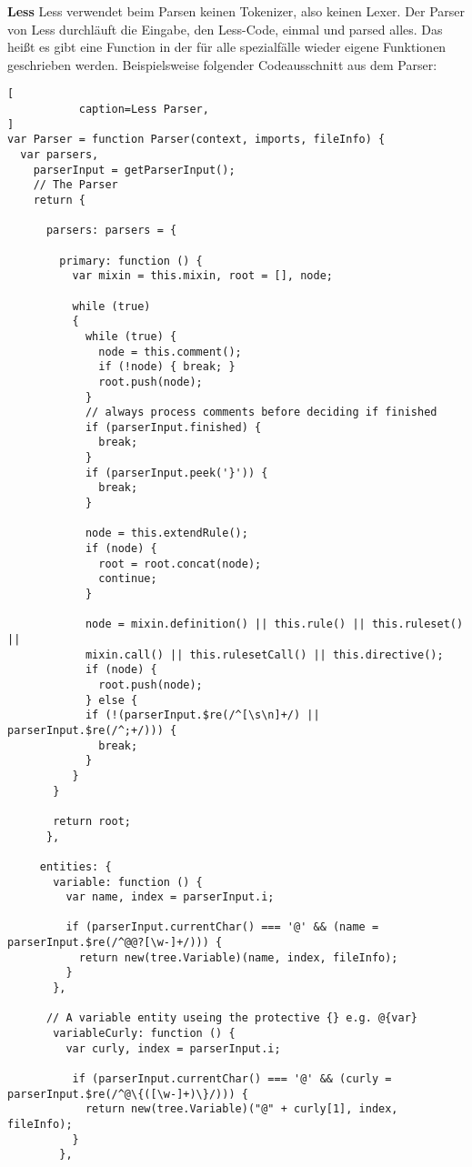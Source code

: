 \textbf{Less}\newline
Less verwendet beim Parsen keinen Tokenizer, also keinen Lexer. Der Parser von Less durchläuft die Eingabe, den Less-Code, einmal und parsed alles. Das heißt es gibt eine Function in der für alle spezialfälle wieder eigene Funktionen geschrieben werden.
Beispielsweise folgender Codeausschnitt aus dem Parser:
\begin{lstlisting}[
           caption=Less Parser,
]
var Parser = function Parser(context, imports, fileInfo) {
  var parsers,
    parserInput = getParserInput();
    // The Parser
    return {
       
      parsers: parsers = {
      
        primary: function () {
          var mixin = this.mixin, root = [], node;

          while (true)
          {
            while (true) {
              node = this.comment();
              if (!node) { break; }
              root.push(node);
            }
            // always process comments before deciding if finished
            if (parserInput.finished) {
              break;
            }
            if (parserInput.peek('}')) {
              break;
            }

            node = this.extendRule();
            if (node) {
              root = root.concat(node);
              continue;
            }

            node = mixin.definition() || this.rule() || this.ruleset() ||
            mixin.call() || this.rulesetCall() || this.directive();
            if (node) {
              root.push(node);
            } else {
            if (!(parserInput.$re(/^[\s\n]+/) || parserInput.$re(/^;+/))) {
              break;
            }
          }
       }

       return root;
      },

     entities: {
       variable: function () {
         var name, index = parserInput.i;

         if (parserInput.currentChar() === '@' && (name = parserInput.$re(/^@@?[\w-]+/))) {
           return new(tree.Variable)(name, index, fileInfo);
         }
       },

      // A variable entity useing the protective {} e.g. @{var}
       variableCurly: function () {
         var curly, index = parserInput.i;

          if (parserInput.currentChar() === '@' && (curly = parserInput.$re(/^@\{([\w-]+)\}/))) {
            return new(tree.Variable)("@" + curly[1], index, fileInfo);
          }
        },


\end{lstlisting}
